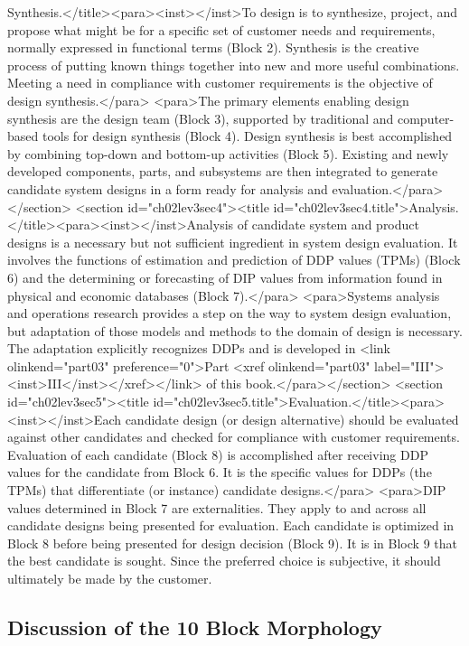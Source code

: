 Synthesis.</title><para><inst></inst>To design is to synthesize, project, and propose what might be for a specific set of customer needs and requirements, normally expressed in functional terms (Block 2). Synthesis is the creative process of putting known things together into new and more useful combinations. Meeting a need in compliance with customer requirements is the objective of design synthesis.</para>
<para>The primary elements enabling design synthesis are the design team (Block 3), supported by traditional and computer-based tools for design synthesis (Block 4). Design synthesis is best accomplished by combining top-down and bottom-up activities (Block 5). Existing and newly developed components, parts, and subsystems are then integrated to generate candidate system designs in a form ready for analysis and evaluation.</para></section>
<section id="ch02lev3sec4"><title id="ch02lev3sec4.title">Analysis.</title><para><inst></inst>Analysis of candidate system and product designs is a necessary but not sufficient ingredient in system design evaluation. It involves the functions of estimation and prediction of DDP values (TPMs) (Block 6) and the determining or forecasting of DIP values from information found in physical and economic databases (Block 7).</para>
<para>Systems analysis and operations research provides a step on the way to system design evaluation, but adaptation of those models and methods to the domain of design is necessary. The adaptation explicitly recognizes DDPs and is developed in <link olinkend="part03" preference="0">Part <xref olinkend="part03" label="III"><inst>III</inst></xref></link> of this book.</para></section>
<section id="ch02lev3sec5"><title id="ch02lev3sec5.title">Evaluation.</title><para><inst></inst>Each candidate design (or design alternative) should be evaluated against other candidates and checked for compliance with customer requirements. Evaluation of each candidate (Block 8) is accomplished after receiving DDP values for the candidate from Block 6. It is the specific values for DDPs (the TPMs) that differentiate (or instance) candidate designs.</para>
<para>DIP values determined in Block 7 are externalities. They apply to and across all candidate designs being presented for evaluation. Each candidate is optimized in Block 8 before being presented for design decision (Block 9). It is in Block 9 that the best candidate is sought. Since the preferred choice is subjective, it should ultimately be made by the customer.

\subsection{Discussion of the 10 Block Morphology}

